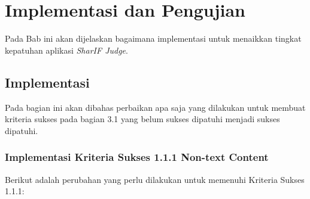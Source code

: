 \chapter{Implementasi dan Pengujian}
\label{chap:implementasi}

Pada Bab ini akan dijelaskan bagaimana implementasi untuk menaikkan tingkat kepatuhan aplikasi \textit{SharIF Judge}.

\section{Implementasi}
\label{sec:implementasi}

Pada bagian ini akan dibahas perbaikan apa saja yang dilakukan untuk membuat kriteria sukses pada bagian 3.1
yang belum sukses dipatuhi menjadi sukses dipatuhi.

\subsection{Implementasi Kriteria Sukses 1.1.1 Non-text Content}
\label{subsec:implementasi_A_1.1.1}

Berikut adalah perubahan yang perlu dilakukan untuk memenuhi Kriteria Sukses 1.1.1:

